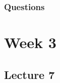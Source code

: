 \documentclass{report}
\begin{document}
\subsection*{Questions}

\chapter{Week 3}
\section{Lecture 7}
\end{document}
